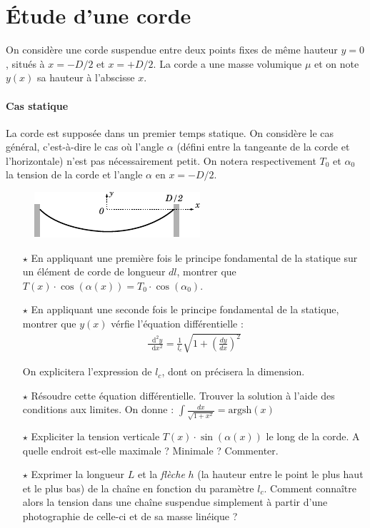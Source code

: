\documentclass{report}
\newcommand*\dif{\mathop{}\!\mathrm{d}}
\begin{document}
\newpage

\section*{Étude d'une corde}

On considère une corde suspendue entre deux points fixes de même hauteur $y=0$, situés à $x=-D/2$ et $x=+D/2$. La corde a une masse volumique $\mu$ et on note $y(x)$ sa hauteur à l'abscisse $x$.

\paragraph{Cas statique} La corde est supposée dans un premier temps statique. On considère le cas général, c'est-à-dire le cas où l'angle $\alpha$ (défini entre la tangeante de la corde et l'horizontale) n'est pas nécessairement petit. On notera respectivement $T_0$ et $\alpha_0$ la tension de la corde et l'angle $\alpha$ en $x=-D/2$.

\begin{figure}[h!]
\centering
		\includegraphics[scale=1.5]{onde1.pdf}
\end{figure}

\begin{itemize}

	\item[$\star$] En appliquant une première fois le principe fondamental de la statique sur un élément de corde de longueur $dl$, montrer que $T(x)\cdot\cos(\alpha(x))=T_0\cdot\cos(\alpha_0)$.

	\item[$\star$] En appliquant une seconde fois le principe fondamental de la statique, montrer que $y(x)$ vérfie l'équation différentielle :
	\begin{align*}
		\frac{\dif^2 y}{\dif x^2} =\frac{1}{l_c}\sqrt{1+\left( \frac{dy}{dx}\right)^2}
	\end{align*}	
	
	On explicitera l'expression de $l_c$, dont on précisera la dimension.
	
	\item[$\star$] Résoudre cette équation différentielle. Trouver la solution à l'aide des conditions aux limites. On donne : $\int \frac{dx}{\sqrt{1+x^2}}=\mathrm{argsh}(x)$
	
	\item[$\star$] Expliciter la tension verticale $T(x)\cdot\sin(\alpha(x))$ le long de la corde. A quelle endroit est-elle maximale ? Minimale ? Commenter. 
	
	\item[$\star$] Exprimer la longueur $L$ et la \textit{flèche} $h$ (la hauteur entre le point le plus haut et le plus bas) de la chaîne en fonction du paramètre $l_c$. Comment connaître alors la tension dans une chaîne suspendue simplement à partir d'une photographie de celle-ci et de sa masse linéique ?
	
\end{itemize}
\end{document}
